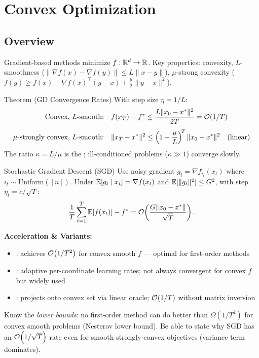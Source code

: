 \section{Convex Optimization}

\subsection{Overview}
Gradient-based methods minimize $f:\mathbb{R}^d\to\mathbb{R}$. Key properties: convexity,
$L$-smoothness ($\|\nabla f(x)-\nabla f(y)\|\le L\|x-y\|$),
$\mu$-strong convexity ($f(y)\ge f(x)+\nabla f(x)^\top(y-x)+\frac{\mu}{2}\|y-x\|^2$).

\begin{keyresult}{Theorem (GD Convergence Rates)}
With step size $\eta = 1/L$:
\begin{align*}
  \text{Convex, $L$-smooth:}\quad
    &f(x_T)-f^* \le \frac{L\|x_0-x^*\|^2}{2T} = \mathcal{O}\!\left(1/T\right)\\[4pt]
  \text{$\mu$-strongly convex, $L$-smooth:}\quad
    &\|x_T-x^*\|^2 \le \left(1-\frac{\mu}{L}\right)^{\!T}\|x_0-x^*\|^2
    \quad\text{(linear)}
\end{align*}
The ratio $\kappa = L/\mu$ is the ; ill-conditioned problems
($\kappa\gg1$) converge slowly.
\end{keyresult}

\begin{defbox}{Stochastic Gradient Descent (SGD)}
Use noisy gradient $g_t = \nabla f_{i_t}(x_t)$ where $i_t \sim \text{Uniform}([n])$.
Under $\mathbb{E}[g_t\mid x_t]=\nabla f(x_t)$ and $\mathbb{E}[\|g_t\|^2]\le G^2$, with step
$\eta_t = c/\sqrt{T}$:
\[
  \frac{1}{T}\sum_{t=1}^T \mathbb{E}[f(x_t)] - f^* = \mathcal{O}\!\left(\frac{G\|x_0-x^*\|}{\sqrt{T}}\right).
\]
\end{defbox}

\textbf{Acceleration \& Variants:}
\begin{itemize}
  \item {}: achieves $\mathcal{O}\!\left(1/T^2\right)$ for convex smooth $f$ —
        optimal for first-order methods
  \item {}: adaptive per-coordinate learning rates; not always convergent
        for convex $f$ but widely used
  \item {}: projects onto convex set via
        linear oracle; $\mathcal{O}\!\left(1/T\right)$ without matrix inversion
\end{itemize}

\begin{examtip}
Know the \emph{lower bounds}: no first-order method can do better than
$\Omega(1/T^2)$ for convex smooth problems (Nesterov lower bound). Be able to
state why SGD has an $\mathcal{O}\!\left(1/\sqrt{T}\right)$ rate even for smooth strongly-convex
objectives (variance term dominates).
\end{examtip}

